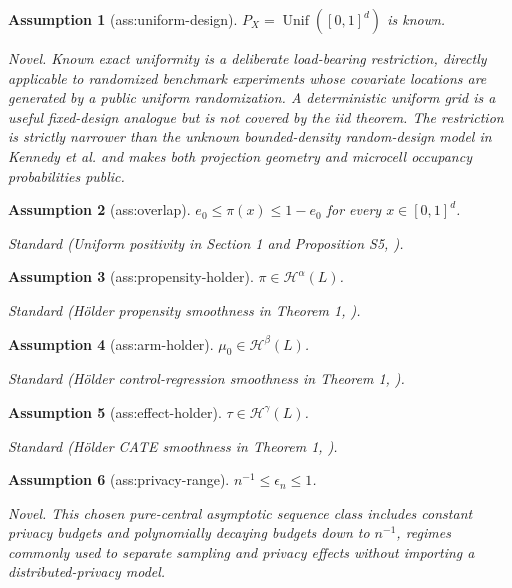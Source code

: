 \documentclass{article}
\newtheorem{assumption}{Assumption}
\begin{document}
\begin{assumption}[ass:uniform-design]\label{ass:uniform-design}
\(P_X=\operatorname{Unif}([0,1]^d)\) is known.
\par\smallskip\noindent\emph{Novel.} Known exact uniformity is a deliberate load-bearing restriction, directly applicable to randomized benchmark experiments whose covariate locations are generated by a public uniform randomization. A deterministic uniform grid is a useful fixed-design analogue but is not covered by the iid theorem. The restriction is strictly narrower than the unknown bounded-density random-design model in Kennedy et al. and makes both projection geometry and microcell occupancy probabilities public.
\end{assumption}

\begin{assumption}[ass:overlap]\label{ass:overlap}
\(e_0\le\pi(x)\le 1-e_0\) for every \(x\in[0,1]^d\).
\par\smallskip\noindent\emph{Standard} (Uniform positivity in Section 1 and Proposition S5, \cite{kennedy2024minimax}).
\end{assumption}

\begin{assumption}[ass:propensity-holder]\label{ass:propensity-holder}
\(\pi\in\mathcal H^\alpha(L)\).
\par\smallskip\noindent\emph{Standard} (Hölder propensity smoothness in Theorem 1, \cite{kennedy2024minimax}).
\end{assumption}

\begin{assumption}[ass:arm-holder]\label{ass:arm-holder}
\(\mu_0\in\mathcal H^\beta(L)\).
\par\smallskip\noindent\emph{Standard} (Hölder control-regression smoothness in Theorem 1, \cite{kennedy2024minimax}).
\end{assumption}

\begin{assumption}[ass:effect-holder]\label{ass:effect-holder}
\(\tau\in\mathcal H^\gamma(L)\).
\par\smallskip\noindent\emph{Standard} (Hölder CATE smoothness in Theorem 1, \cite{kennedy2024minimax}).
\end{assumption}

\begin{assumption}[ass:privacy-range]\label{ass:privacy-range}
\(n^{-1}\le\epsilon_n\le 1\).
\par\smallskip\noindent\emph{Novel.} This chosen pure-central asymptotic sequence class includes constant privacy budgets and polynomially decaying budgets down to \(n^{-1}\), regimes commonly used to separate sampling and privacy effects without importing a distributed-privacy model.
\end{assumption}
\end{document}
